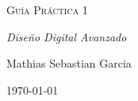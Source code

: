 \documentclass{article}
\begin{document}
\begin{titlepage}
    \centering
    \vspace{4cm}
    {\scshape\Huge Guía Práctica 1 \par}
    \vspace{3cm}
    {\itshape\Large Diseño Digital Avanzado \par}
    \vfill
    {\Large Mathias Sebastian Garcia\par}
    \vfill
    {\Large \today\par}
\end{titlepage}

\tableofcontents





 
\end{document}
